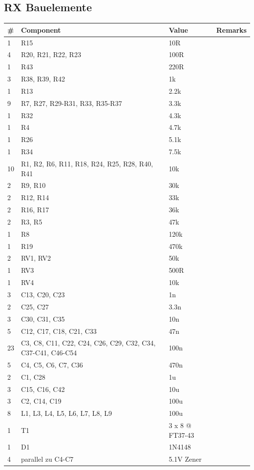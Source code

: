 \documentclass[10pt, a4paper,twoside]{scrartcl}
\begin{document}
\subsection{RX Bauelemente}  \label{sec:rxcomp}
\begin{longtable}{|l|p{6cm}|l|l|} \hline 
\# & Component & Value & Remarks \\ \hline 
1 & R15 & 10R & \\
4 & R20, R21, R22, R23 & 100R & \\
1 & R43 & 220R & \\
3 & R38, R39, R42 & 1k & \\
1 & R13 & 2.2k & \\
9 & R7, R27, R29-R31, R33, R35-R37 & 3.3k & \\
1 & R32 & 4.3k & \\
1 & R4 & 4.7k & \\
1 & R26 & 5.1k & \\
1 & R34 & 7.5k & \\
10 & R1, R2, R6, R11, R18, R24, R25, R28, R40, R41 & 10k & \\
2 & R9, R10 & 30k & \\
2 & R12, R14 & 33k & \\
2 & R16, R17 & 36k & \\
2 & R3, R5 & 47k & \\
1 & R8 & 120k & \\
1 & R19 & 470k & \\
2 & RV1, RV2 & 50k & \\
1 & RV3 & 500R & \\
1 & RV4 & 10k & \\
3 & C13, C20, C23 & 1n & \\
2 & C25, C27 & 3.3n & \\
3 & C30, C31, C35 & 10n & \\
5 & C12, C17, C18, C21, C33 & 47n & \\
23 & C3, C8, C11, C22, C24, C26, C29, C32, C34, C37-C41, C46-C54 & 100n & \\
5 & C4, C5, C6, C7, C36 & 470n & \\
2 & C1, C28 & 1u & \\
3 & C15, C16, C42 & 10u & \\
3 & C2, C14, C19 & 100u & \\
8 & L1, L3, L4, L5, L6, L7, L8, L9 & 100u & \\
1 & T1 & 3 x 8 @ FT37-43 & \\
1 & D1 & 1N4148 & \\
4 & parallel zu C4-C7 & 5.1V Zener & \\

\end{longtable}
\end{document}
